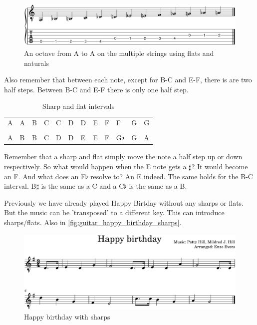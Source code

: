 \begin{figure}[h]
	\centering
	\includegraphics[width=\textwidth]{../../MuseScore/Guitar/PitchesFlatsMultiString.png}
	\caption{An octave from A to A on the multiple strings using flats and naturals}
	\label{fig:guitar_string_a_octave_multi_string_flats_chap_music_notation}
\end{figure}

Also remember that between each note, except for B-C and E-F, there is are two half steps. Between B-C and E-F there is only one half step.

\begin{table}[h]
	\centering
	\begin{tabular}{*{12}{P{5mm}}}
		\large{A} & \large{A\sharp} & \large{B} & \large{C} & \large{C\sharp} & \large{D} & \large{D\sharp} & \large{E} & \large{F} & \large{F\sharp} & \large{G} & \large{G\sharp} \\ \\
		\large{A} & \large{B\flat} & \large{B} & \large{C} & \large{D\flat} & \large{D} & \large{E\flat} & \large{E} & \large{F} & \large{G$\flat$}& \large{G} & \large{A\flat}
	\end{tabular}
	\caption{Sharp and flat intervals}
	\label{tab:guitar_sharp_flat_intervals}
\end{table}

Remember that a sharp and flat simply move the note a half step up or down respectively. So what would happen when the E note gets a $\sharp$? It would become an F. And what does an F$\flat$ resolve to? An E indeed. The same holds for the B-C interval. B$\sharp$ is the same as a C and a C$\flat$ is the same as a B.

\newpage

Previously we have already played Happy Birtday without any sharps or flats. But the music can be 'transposed' to a different key. This can introduce sharps/flats. Also in \autoref{fig:guitar_happy_birthday_sharps}.

\begin{figure}[h]
	\centering
	\includegraphics[width=\textwidth]{../../MuseScore/Guitar/GuitarHappyBirthdaySharps.png}
	\caption{Happy birthday with sharps}
	\label{fig:guitar_happy_birthday_sharps}
\end{figure}

